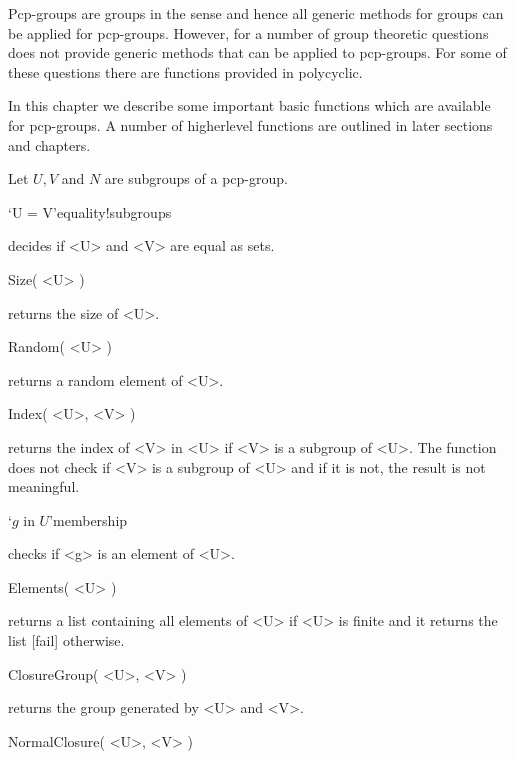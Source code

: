 

Pcp-groups are groups in the {\GAP} sense and hence all generic {\GAP}
methods for groups can be applied for pcp-groups.  However, for a
number of group theoretic questions {\GAP} does not provide generic
methods that can be applied to pcp-groups. For some of these questions
there are functions provided in {\sf polycyclic}.

\label{methods}

In this chapter we describe some important basic functions which are 
available for pcp-groups. A number of higherlevel functions are outlined 
in later sections and chapters.

Let $U, V$ and $N$ are subgroups of a pcp-group.

\>`U = V'{equality}!{subgroups}

decides if <U> and <V> are equal as sets.

\>Size( <U> )

returns the size of <U>.

\>Random( <U> )

returns a random element of <U>. 

\>Index( <U>, <V> )

returns the index of  <V> in <U>  if <V>  is  a subgroup of  <U>.  The
function does not check if <V> is a subgroup of <U> and  if it is not,
the result is not meaningful.

\>`$g$ in $U$'{membership}

checks if <g> is an element of <U>.

\>Elements( <U> )

returns a list  containing all elements of  <U> if <U> is finite and it
returns the list [fail] otherwise.

\>ClosureGroup( <U>, <V> )

returns the group generated by <U> and <V>.

\>NormalClosure( <U>, <V> )

